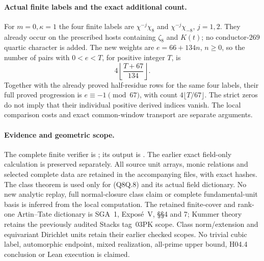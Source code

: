 \paragraph{Actual finite labels and the exact additional count.}
For $m=0,\kappa=1$ the four finite labels are
$\chi^{-j}\chi_8$ and $\chi^{-j}\chi_{-8}$, $j=1,2$.
They already occur on the prescribed hosts containing $\zeta_8$
and $K(t)$; no conductor-$269$ quartic character is added.
The new weights are $e=66+134n$, $n\geq0$, so the number of
pairs with $0<e<T$, for positive integer $T$, is
\[
                           4\left\lfloor\frac{T+67}{134}\right\rfloor.
 \tag{Q8Q.18}
\]
Together with the already proved half-residue rows for the same
four labels, their full proved progression is $e\equiv-1\pmod{67}$,
with count $4\lfloor T/67\rfloor$.
The strict zeros do not imply that their individual positive
derived indices vanish.  The local comparison costs and exact
common-window transport are separate arguments.

\paragraph{Evidence and geometric scope.}
The complete finite verifier is
; its output is
.
The earlier exact field-only calculation is preserved separately.
All source unit arrays, monic relations and selected complete
data are retained in the accompanying files, with exact hashes.
The class theorem is used only for (Q8Q.8) and its actual field
dictionary.  No new analytic replay, full normal-closure class
claim or complete fundamental-unit basis is inferred from the
local computation.
The retained finite-cover and rank-one Artin--Tate dictionary
is SGA~1, Expos\'e~V, \S\S4 and 7; Kummer theory retains the
previously audited Stacks tag~03PK scope.
Class norm/extension and equivariant Dirichlet units retain
their earlier checked scopes.
No trivial cubic label, automorphic endpoint, mixed realization,
all-prime upper bound, H04.4 conclusion or Lean execution is claimed.
